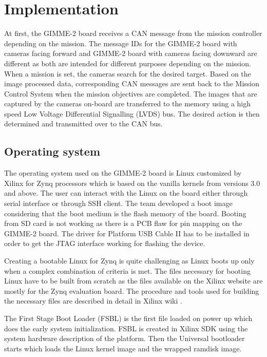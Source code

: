 \section{Implementation}\label{sec:implementation}
At first, the GIMME-2 board receives a CAN message from the mission controller depending on the mission. The message IDs for the GIMME-2 board with cameras facing forward and GIMME-2 board with cameras facing downward are different as both are intended for different purposes depending on the mission. When a mission is set, the cameras search for the desired target. Based on the image processed data, corresponding CAN messages are sent back to the Mission Control System when the mission objectives are completed. The images that are captured by the cameras on-board are transferred to the memory using a high speed Low Voltage Differential Signalling (LVDS) bus. The desired action is then determined and transmitted over to the CAN bus.

\subsection{Operating system}
The operating system used on the GIMME-2 board is Linux customized by Xilinx for Zynq processors which is based on the vanilla kernels from versions 3.0 and above. The user can interact with the Linux on the board either through serial interface or through SSH client. The team developed a boot image considering that the boot medium is the flash memory of the board. Booting from SD card is not working as there is a PCB flaw for pin mapping on the GIMME-2 board. The driver for Platform USB Cable II has to be installed in order to get the JTAG interface working for flashing the device.

Creating a bootable Linux for Zynq is quite challenging as Linux boots up only when a complex combination of criteria is met. The files necessary for booting Linux have to be built from scratch as the files available on the Xilinx website are mostly for the Zynq evaluation board. The procedure and tools used for building the necessary files are described in detail in Xilinx wiki \cite{web:XilinxWiki}. 

The First Stage Boot Loader (FSBL) is the first file loaded on power up which does the early system initialization. FSBL is created in Xilinx SDK using the system hardware description of the platform. Then the Universal bootloader starts which loads the Linux kernel image and the wrapped ramdisk image.

